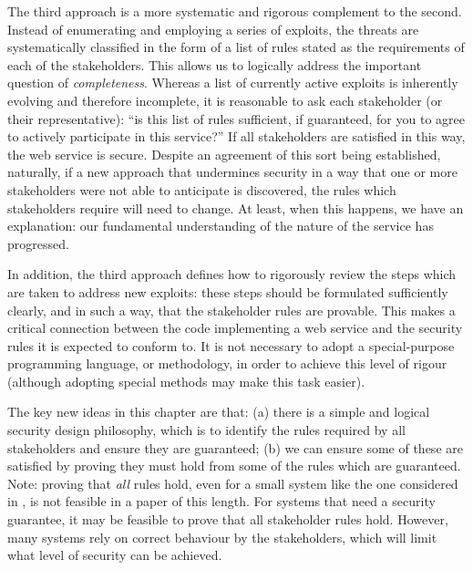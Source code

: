 The third approach is a more systematic and rigorous complement to the second. Instead of enumerating and employing a series of exploits, the threats are systematically classified in the form of a list of rules stated as the requirements of each of the stakeholders. This allows us to logically address the important question of {\em completeness}. Whereas a list of currently active exploits is inherently evolving and therefore incomplete, it is reasonable to ask each stakeholder (or their representative): ``is this list of rules sufficient, if guaranteed, for you to agree to actively participate in this service?'' If all stakeholders are satisfied in this way, the web service is secure. Despite an agreement of this sort being established, naturally, if a new approach that undermines security in a way that one or more stakeholders were not able to anticipate is discovered, the rules which stakeholders require will need to change. At least, when this happens, we have an explanation: our fundamental understanding of the nature of the service has progressed.

In addition, the third approach defines how to rigorously review the steps which are taken to address new exploits: these steps should be formulated sufficiently clearly, and in such a way, that the stakeholder rules are provable. This makes a critical connection between the code implementing a web service and the security rules it is expected to conform to. It is not necessary to adopt a special-purpose programming language, or methodology, in order to achieve this level of rigour (although adopting special methods may make this task easier).

The key new ideas in this chapter are that: (a) there is a simple and logical security design philosophy, which is to identify the rules required by all stakeholders and ensure they are guaranteed; (b) we can ensure some of these are satisfied by proving they must hold from some of the rules which are guaranteed. Note: proving that {\em all} rules hold, even for a small system like the one considered in \cite{sheniar2018experiments}, is not feasible in a paper of this length. For systems that need a security guarantee, it may be feasible to prove that all stakeholder rules hold. However, many systems rely on correct behaviour by the stakeholders, which will limit what level of security can be achieved.

	




